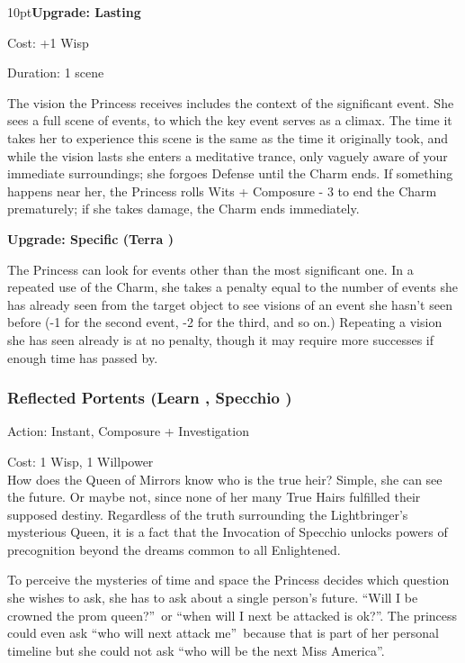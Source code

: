 \begin{myindentpar}{10pt}\textbf{Upgrade: Lasting}

\noindent Cost: +1 Wisp

\noindent Duration: 1 scene 

The vision the Princess receives includes the context of the significant event. She sees a full scene of events, to which the key event serves as a climax. The time it takes her to experience this scene is the same as the time it originally took, and while the vision lasts she enters a meditative trance, only vaguely aware of your immediate surroundings; she forgoes Defense until the Charm ends. If something happens near her, the Princess rolls Wits + Composure - 3 to end the Charm prematurely; if she takes damage, the Charm ends immediately.

\textbf{Upgrade: Specific (Terra \textbullet\textbullet)}

The Princess can look for events other than the most significant one. In a repeated use of the Charm, she takes a penalty equal to the number of events she has already seen from the target object to see visions of an event she hasn't seen before (-1 for the second event, -2 for the third, and so on.) Repeating a vision she has seen already is at no penalty, though it may require more successes if enough time has passed by.\end{myindentpar}

\subsubsection*{Reflected Portents (Learn \textbullet\textbullet\textbullet, Specchio \textbullet\textbullet\textbullet)}

\noindent Action: Instant, Composure + Investigation

\noindent Cost: 1 Wisp, 1 Willpower \\

\noindent How does the Queen of Mirrors know who is the true heir? Simple, she can see the future. Or maybe not, since none of her many True Hairs fulfilled their supposed destiny. Regardless of the truth surrounding the Lightbringer's mysterious Queen, it is a fact that the Invocation of Specchio unlocks powers of precognition beyond the dreams common to all Enlightened.

To perceive the mysteries of time and space the Princess decides which question she wishes to ask, she has to ask about a single person's future. \textquotedblleft Will I be crowned the prom queen?\textquotedblright\, or \textquotedblleft when will I next be attacked is ok?\textquotedblright. The princess could even ask \textquotedblleft who will next attack me\textquotedblright\, because that is part of her personal timeline but she could not ask \textquotedblleft who will be the next Miss America\textquotedblright.


